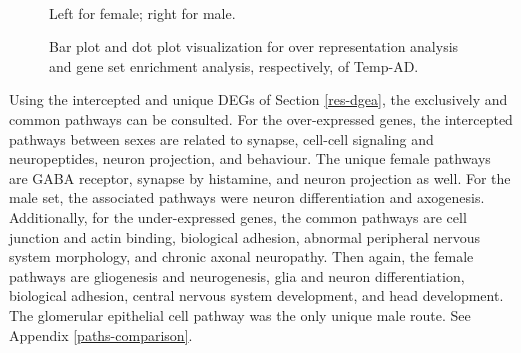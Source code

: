 \begin{figure}[!ht]%
    \centering
    \qquad
    \\
    \qquad
\caption{Bar plot and dot plot visualization for over representation analysis and gene set enrichment analysis, respectively, of Temp-AD.}
\footnotesize Left for female; right for male.
\label{fig:path-temp-ad}%
\end{figure}

Using the intercepted and unique DEGs of Section \ref{res-dgea}, the exclusively and common pathways can be consulted. For the over-expressed genes, the intercepted pathways between sexes are related to synapse, cell-cell signaling and neuropeptides, neuron projection, and behaviour. The unique female pathways are GABA receptor, synapse by histamine, and neuron projection as well. For the male set, the associated pathways were neuron differentiation and axogenesis. Additionally, for the under-expressed genes, the common pathways are cell junction and actin binding, biological adhesion, abnormal peripheral nervous system morphology, and chronic axonal neuropathy. Then again, the female pathways are gliogenesis and neurogenesis, glia and neuron differentiation, biological adhesion, central nervous system development, and head development. The glomerular epithelial cell pathway was the only unique male route. See Appendix \ref{paths-comparison}.

